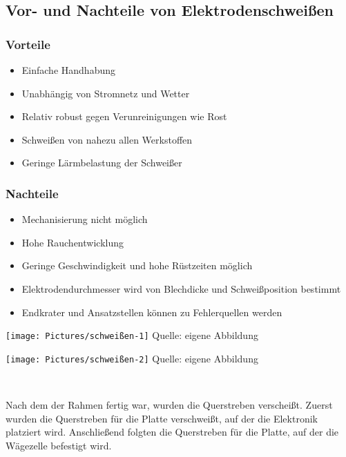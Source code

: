 \documentclass[ngerman,12pt,a4paper]{article}
\begin{document}
	\newpage
	\subsection{Vor- und Nachteile von Elektrodenschweißen}
	
	 \subsubsection*{Vorteile}
	
	 \begin{itemize}
	 		\item Einfache Handhabung
	 		\item Unabhängig von Stromnetz und Wetter
	 		\item Relativ robust gegen Verunreinigungen wie Rost
	 		\item Schweißen von nahezu allen Werkstoffen
	 		\item Geringe Lärmbelastung der Schweißer
	 \end{itemize}
	 
	 \subsubsection*{Nachteile}
	 
	 \begin{itemize}
	 		\item Mechanisierung nicht möglich
	 		\item Hohe Rauchentwicklung
	 		\item Geringe Geschwindigkeit und hohe Rüstzeiten möglich
	 		\item Elektrodendurchmesser wird von Blechdicke und Schweißposition bestimmt
	  		\item Endkrater und Ansatzstellen können zu Fehlerquellen werden
	 \end{itemize}
	 
	 \begin{center}
	 	\begin{minipage}{0.4\linewidth}
	 		\centering
	 		\texttt{[image: Pictures/schweißen-1]}
	 		\label{fig:schweißen-1}
	 		\small Quelle: eigene Abbildung
	 	\end{minipage}
	 	\hfill
	 	\begin{minipage}{0.4\linewidth}
	 		\centering
	 		\texttt{[image: Pictures/schweißen-2]}
	 		\label{fig:schweißen-2}
	 		\small Quelle: eigene Abbildung
	 	\end{minipage} \\[0.75cm]
	 \end{center} 
	Nach dem der Rahmen fertig war, wurden die Querstreben verscheißt. Zuerst wurden die Querstreben für die Platte verschweißt, auf der die Elektronik platziert wird. Anschließend folgten die Querstreben für die Platte, auf der die Wägezelle befestigt wird.
	
\end{document}
